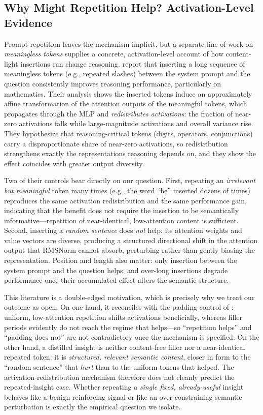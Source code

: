\subsection{Why Might Repetition Help? Activation-Level Evidence}
\label{subsec:rw-meaningless}

Prompt repetition leaves the mechanism implicit, but a separate line of work on
\emph{meaningless tokens} supplies a concrete, activation-level account of how
content-light insertions can change reasoning. \citet{shi2025meaningless} report
that inserting a long sequence of meaningless tokens (e.g., repeated slashes)
between the system prompt and the question consistently improves reasoning
performance, particularly on mathematics. Their analysis shows the inserted tokens
induce an approximately affine transformation of the attention outputs of the
meaningful tokens, which propagates through the MLP and \emph{redistributes
activations}: the fraction of near-zero activations falls while large-magnitude
activations and overall variance rise. They hypothesize that reasoning-critical
tokens (digits, operators, conjunctions) carry a disproportionate share of near-zero
activations, so redistribution strengthens exactly the representations reasoning
depends on, and they show the effect coincides with greater output diversity.

Two of their controls bear directly on our question. First, repeating an
\emph{irrelevant but meaningful} token many times (e.g., the word ``he'' inserted
dozens of times) reproduces the same activation redistribution and the same
performance gain, indicating that the benefit does not require the insertion to be
semantically informative---repetition of near-identical, low-attention content is
sufficient. Second, inserting a \emph{random sentence} does \emph{not} help: its
attention weights and value vectors are diverse, producing a structured directional
shift in the attention output that RMSNorm cannot absorb, perturbing rather than
gently biasing the representation. Position and length also matter: only insertion
between the system prompt and the question helps, and over-long insertions degrade
performance once their accumulated effect alters the semantic structure.

This literature is a double-edged motivation, which is precisely why we treat our
outcome as open. On one hand, it reconciles with the padding control of
\citet{leviathan2025prompt}: uniform, low-attention repetition shifts activations
beneficially, whereas filler periods evidently do not reach the regime that
helps---so ``repetition helps'' and ``padding does not'' are not contradictory once
the mechanism is specified. On the other hand, a distilled insight is neither
content-free filler nor a near-identical repeated token: it is \emph{structured,
relevant semantic content}, closer in form to the ``random sentence'' that
\emph{hurt} than to the uniform tokens that helped. The activation-redistribution
mechanism therefore does not cleanly predict the repeated-insight case. Whether
repeating a \emph{single fixed, already-useful} insight behaves like a benign
reinforcing signal or like an over-constraining semantic perturbation is exactly the
empirical question we isolate.

